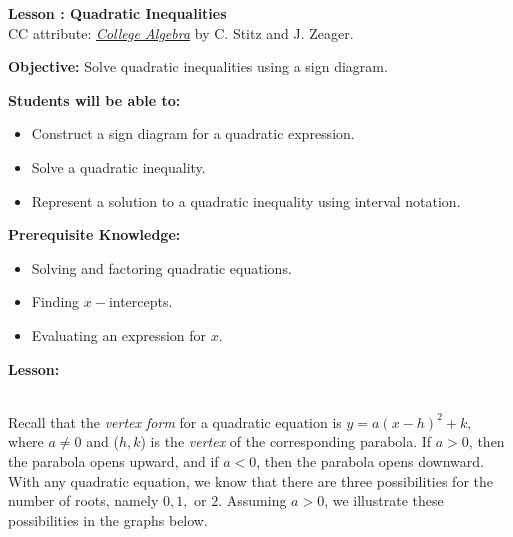 \documentclass[12pt]{article}
\theoremstyle{definition}
\begin{document}
{\bf \large Lesson : Quadratic Inequalities}\label{les:quadratic_inequalities}
\\ CC attribute: \href{http://www.stitz-zeager.com}{\it{College Algebra}} by C. Stitz and J. Zeager. 
\hfill \doclicenseImage[imagewidth=5em]\\
\par
{\bf Objective:} Solve quadratic inequalities using a sign diagram.\\
\par
{\bf Students will be able to:}
\begin{itemize}
	\item Construct a sign diagram for a quadratic expression.
	\item Solve a quadratic inequality.
	\item Represent a solution to a quadratic inequality using interval notation.
\end{itemize}
{\bf Prerequisite Knowledge:}
\begin{itemize}
	\item Solving and factoring quadratic equations.
	\item Finding $x-$intercepts.
	\item Evaluating an expression for $x$.
\end{itemize}
\hrulefill

{\bf Lesson:}\\
\ \par
Recall that the {\it vertex form} for a quadratic equation is $y=a(x-h)^2+k,$ where $a\neq 0$ and ($h,k$) is the {\it vertex} of the corresponding parabola.  If $a>0$, then the parabola opens upward, and if $a<0$, then the parabola opens downward.  With any quadratic equation, we know that there are three possibilities for the number of roots, namely $0,1,$ or $2$.  Assuming $a>0$, we illustrate these possibilities in the graphs below.

\begin{center}
\end{center}
\end{document}
